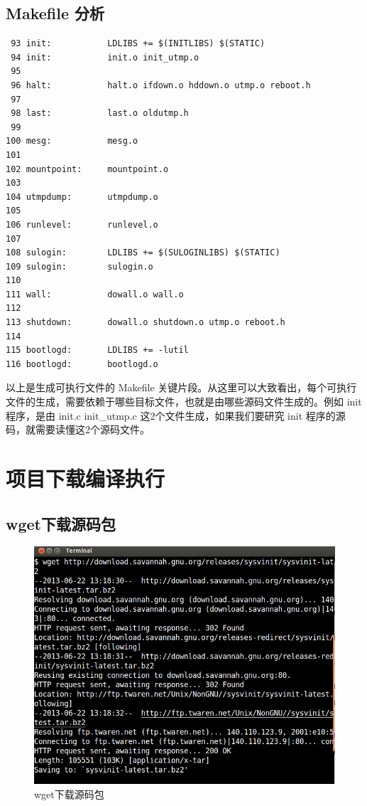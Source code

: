 \subsection{Makefile 分析}

{\begin{shaded}\begin{verbatim}
 93 init:           LDLIBS += $(INITLIBS) $(STATIC)
 94 init:           init.o init_utmp.o
 95 
 96 halt:           halt.o ifdown.o hddown.o utmp.o reboot.h
 97 
 98 last:           last.o oldutmp.h
 99 
100 mesg:           mesg.o
101 
102 mountpoint:     mountpoint.o
103 
104 utmpdump:       utmpdump.o
105 
106 runlevel:       runlevel.o
107 
108 sulogin:        LDLIBS += $(SULOGINLIBS) $(STATIC)
109 sulogin:        sulogin.o
110 
111 wall:           dowall.o wall.o
112 
113 shutdown:       dowall.o shutdown.o utmp.o reboot.h
114 
115 bootlogd:       LDLIBS += -lutil
116 bootlogd:       bootlogd.o
\end{verbatim}\end{shaded}}
以上是生成可执行文件的 Makefile
关键片段。从这里可以大致看出，每个可执行文件的生成，需要依赖于哪些目标文件，也就是由哪些源码文件生成的。例如
init 程序，是由 init.c init\_utmp.c 这2个文件生成，如果我们要研究 init
程序的源码，就需要读懂这2个源码文件。

\section{项目下载编译执行}

\subsection{wget下载源码包}

\begin{figure}[htbp]
\centering
\includegraphics{./pictures/1-1-wget.png}
\caption{wget下载源码包}
\end{figure}

